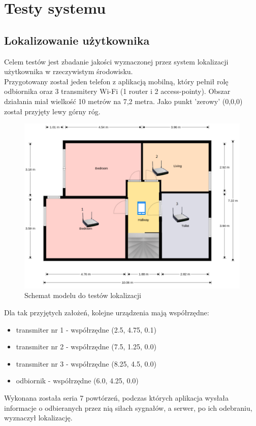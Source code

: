 \chapter{Testy systemu}
\section{Lokalizowanie użytkownika}
Celem testów jest zbadanie jakości wyznaczonej przez system lokalizacji użytkownika w rzeczywistym środowisku.\\
Przygotowany został jeden telefon z aplikacją mobilną, który pełnił rolę odbiornika oraz 3 transmitery Wi-Fi (1 router i 2 access-pointy). Obszar działania miał wielkość 10 metrów na 7,2 metra. Jako punkt 'zerowy' (0,0,0) został przyjęty lewy górny róg. 
\begin{figure}[H]			
	\centering
	\caption{Schemat modelu do testów lokalizacji}
	\includegraphics[width=1.0\textwidth]{plan}
\end{figure}
Dla tak przyjętych założeń, kolejne urządzenia mają współrzędne:
\begin{itemize}
	\item transmiter nr 1 - współrzędne (2.5, 4.75, 0.1)
	\item transmiter nr 2 - współrzędne (7.5, 1.25, 0.0)
	\item transmiter nr 3 - współrzędne (8.25, 4.5, 0.0)
	\item odbiornik - współrzędne (6.0, 4.25, 0.0)
\end{itemize}
Wykonana została seria 7 powtórzeń, podczas których aplikacja wysłała informacje o odbieranych przez nią siłach sygnałów, a serwer, po ich odebraniu, wyznaczył lokalizację.
